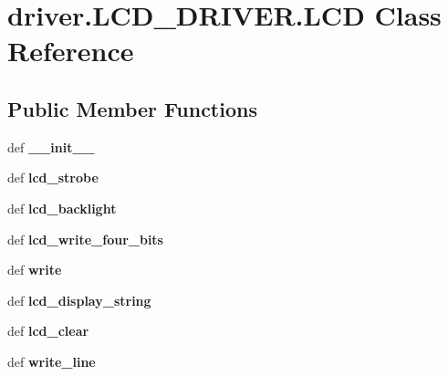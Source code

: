 \hypertarget{classdriver_1_1LCD__DRIVER_1_1LCD}{}\section{driver.\+L\+C\+D\+\_\+\+D\+R\+I\+V\+E\+R.\+L\+C\+D Class Reference}
\label{classdriver_1_1LCD__DRIVER_1_1LCD}
\subsection*{Public Member Functions}
\begin{DoxyCompactItemize}
\item 
\hypertarget{classdriver_1_1LCD__DRIVER_1_1LCD_a20225b4d0a79ea608ab2788528735b17}{}def {\bfseries \+\_\+\+\_\+init\+\_\+\+\_\+}\label{classdriver_1_1LCD__DRIVER_1_1LCD_a20225b4d0a79ea608ab2788528735b17}

\item 
\hypertarget{classdriver_1_1LCD__DRIVER_1_1LCD_a15e214b2ce2f4e8e6e4eb46db360eb17}{}def {\bfseries lcd\+\_\+strobe}\label{classdriver_1_1LCD__DRIVER_1_1LCD_a15e214b2ce2f4e8e6e4eb46db360eb17}

\item 
\hypertarget{classdriver_1_1LCD__DRIVER_1_1LCD_ac5e728a550c74f93db7aeac717f71f56}{}def {\bfseries lcd\+\_\+backlight}\label{classdriver_1_1LCD__DRIVER_1_1LCD_ac5e728a550c74f93db7aeac717f71f56}

\item 
\hypertarget{classdriver_1_1LCD__DRIVER_1_1LCD_a50b4cd9441fc0869a3fc02823e1c4b50}{}def {\bfseries lcd\+\_\+write\+\_\+four\+\_\+bits}\label{classdriver_1_1LCD__DRIVER_1_1LCD_a50b4cd9441fc0869a3fc02823e1c4b50}

\item 
\hypertarget{classdriver_1_1LCD__DRIVER_1_1LCD_ad163c5a30bf46c9b7e794af4c5ee1580}{}def {\bfseries write}\label{classdriver_1_1LCD__DRIVER_1_1LCD_ad163c5a30bf46c9b7e794af4c5ee1580}

\item 
\hypertarget{classdriver_1_1LCD__DRIVER_1_1LCD_a234077a291a2a5fca1bac4e9cf6c05d0}{}def {\bfseries lcd\+\_\+display\+\_\+string}\label{classdriver_1_1LCD__DRIVER_1_1LCD_a234077a291a2a5fca1bac4e9cf6c05d0}

\item 
\hypertarget{classdriver_1_1LCD__DRIVER_1_1LCD_a6d9ced9d16566a567806e0bc2db053b4}{}def {\bfseries lcd\+\_\+clear}\label{classdriver_1_1LCD__DRIVER_1_1LCD_a6d9ced9d16566a567806e0bc2db053b4}

\item 
\hypertarget{classdriver_1_1LCD__DRIVER_1_1LCD_a4b8df3a45944a01d6a12b88f79d0d337}{}def {\bfseries write\+\_\+line}\label{classdriver_1_1LCD__DRIVER_1_1LCD_a4b8df3a45944a01d6a12b88f79d0d337}

\end{DoxyCompactItemize}
